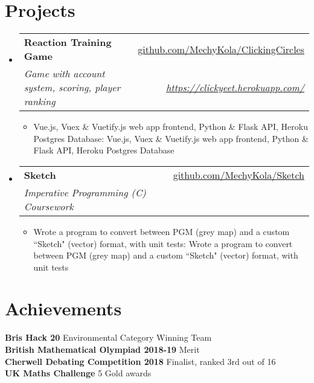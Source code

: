 \documentclass[a4paper,11pt]{article}
\makeatletter
\def \ifempty#1{\def\temp{#1} \ifx\temp\empty }
\newcommand{\resumeItem}[2]{
  \item\small{
  	\ifempty{#1}#2\else\textbf{#1}{: #2 \vspace{-2pt}}\fi
  }
}
\newcommand{\resumeSubheading}[4]{
  \vspace{-1pt}\item
    \begin{tabular*}{0.97\textwidth}{l@{\extracolsep{\fill}}r}
      \textbf{#1} & #2 \\
      \textit{\small#3} & \textit{\small #4} \\
    \end{tabular*}\vspace{-5pt}
}
\newcommand{\resumeSubHeadingListStart}{\begin{itemize}[leftmargin=*]}
\newcommand{\resumeSubHeadingListEnd}{\end{itemize}}
\newcommand{\resumeItemListStart}{\begin{itemize}}
\newcommand{\resumeItemListEnd}{\end{itemize}\vspace{-5pt}}
\makeatother
\begin{document}
\section{Projects}
  \resumeSubHeadingListStart
    \resumeSubheading
      {Reaction Training Game}{\href{https://github.com/MechyKola/ClickingCircles}
      {github.com/MechyKola/ClickingCircles}}
      {Game with account system, scoring, player ranking}{\href{https://clickyeet.herokuapp.com/}
      {https://clickyeet.herokuapp.com/}}
      \resumeItemListStart
        \resumeItem{}
          {Vue.js, Vuex \& Vuetify.js web app frontend, Python \& Flask API, Heroku Postgres Database}
      \resumeItemListEnd
    \resumeSubheading
      {Sketch}{\href{https://github.com/MechyKola/Sketch}
      {github.com/MechyKola/Sketch}}
      {Imperative Programming (C) Coursework}{}
      \resumeItemListStart
        \resumeItem{}
          {Wrote a program to convert between PGM (grey map) and a custom ``Sketch" (vector) format, with unit tests}
      \resumeItemListEnd
  \resumeSubHeadingListEnd


\section{Achievements}
  \textbf{Bris Hack 20}{ Environmental Category Winning Team} \\
  \textbf{British Mathematical Olympiad 2018-19}{ Merit} \\
  \textbf{Cherwell Debating Competition 2018}{ Finalist, ranked 3rd out of 16} \\
  \textbf{UK Maths Challenge}{ 5 Gold  awards} \\
  
  
\end{document}
